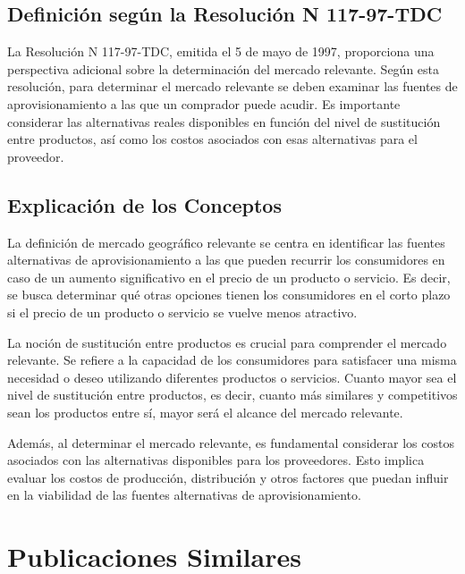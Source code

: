 \documentclass[
  letterpaper,
  DIV=11,
  numbers=noendperiod]{scrartcl}
\begin{document}
\hypertarget{definiciuxf3n-seguxfan-la-resoluciuxf3n-n-117-97-tdc}{%
\subsection{Definición según la Resolución N
117-97-TDC}\label{definiciuxf3n-seguxfan-la-resoluciuxf3n-n-117-97-tdc}}

La Resolución N 117-97-TDC, emitida el 5 de mayo de 1997, proporciona
una perspectiva adicional sobre la determinación del mercado relevante.
Según esta resolución, para determinar el mercado relevante se deben
examinar las fuentes de aprovisionamiento a las que un comprador puede
acudir. Es importante considerar las alternativas reales disponibles en
función del nivel de sustitución entre productos, así como los costos
asociados con esas alternativas para el proveedor.

\hypertarget{explicaciuxf3n-de-los-conceptos}{%
\subsection{Explicación de los
Conceptos}\label{explicaciuxf3n-de-los-conceptos}}

La definición de mercado geográfico relevante se centra en identificar
las fuentes alternativas de aprovisionamiento a las que pueden recurrir
los consumidores en caso de un aumento significativo en el precio de un
producto o servicio. Es decir, se busca determinar qué otras opciones
tienen los consumidores en el corto plazo si el precio de un producto o
servicio se vuelve menos atractivo.

La noción de sustitución entre productos es crucial para comprender el
mercado relevante. Se refiere a la capacidad de los consumidores para
satisfacer una misma necesidad o deseo utilizando diferentes productos o
servicios. Cuanto mayor sea el nivel de sustitución entre productos, es
decir, cuanto más similares y competitivos sean los productos entre sí,
mayor será el alcance del mercado relevante.

Además, al determinar el mercado relevante, es fundamental considerar
los costos asociados con las alternativas disponibles para los
proveedores. Esto implica evaluar los costos de producción, distribución
y otros factores que puedan influir en la viabilidad de las fuentes
alternativas de aprovisionamiento.

\hypertarget{publicaciones-similares}{%
\section{Publicaciones Similares}\label{publicaciones-similares}}
\end{document}
